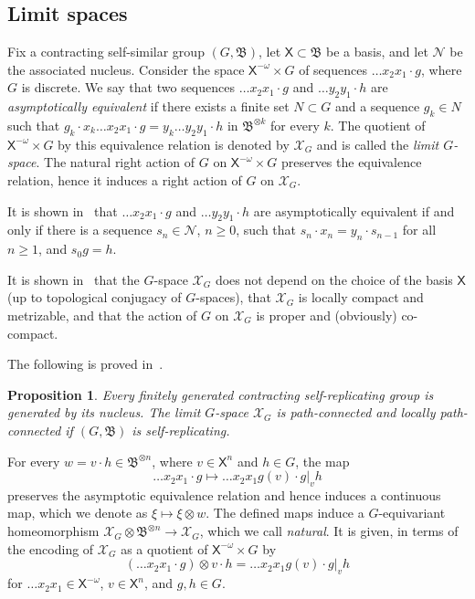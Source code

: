 \documentclass[11pt]{amsart}
\newcommand{\bim}{\mathfrak{B}}
\newcommand{\arr}{\longrightarrow}
\newcommand{\limg}[1][G]{\mathcal{X}_{#1}}
\newcommand{\xmo}{\alb^{-\omega}}
\newcommand{\alb}{\ensuremath{\mathsf{X}}}%
\newcommand{\nuke}{\ensuremath{\mathcal{N}}}%
\theoremstyle{definition}
\theoremstyle{plain}
\newtheorem{main thm}{Theorem}
\newtheorem{prop}[defin]{Proposition}
\theoremstyle{remark}
\theoremstyle{plain}
\begin{document}
\subsection{Limit spaces}
Fix a contracting self-similar group $(G, \bim)$, let $\alb\subset\bim$ be a basis, and let $\nuke$ be the associated nucleus. Consider the space $\alb^{-\omega}\times G$ of sequences $\ldots x_2x_1\cdot g$, where $G$ is discrete. We say that two sequences $\ldots x_2x_1\cdot g$ and $\ldots y_2y_1\cdot h$ are \emph{asymptotically equivalent} if there exists a finite set $N\subset G$ and a sequence $g_k\in N$ such that $g_k\cdot x_k\ldots x_2x_1\cdot g=y_k\ldots y_2y_1\cdot h$ in $\bim^{\otimes k}$ for every $k$. The quotient of $\alb^{-\omega}\times G$ by this equivalence relation is denoted by $\limg$ and is called the \emph{limit $G$-space}. The natural right action of $G$ on $\alb^{-\omega}\times G$ preserves the equivalence relation, hence it induces a right action of $G$ on $\limg$.

It is shown in~\cite[Proposition~3.2.6]{Nek:book} that $\ldots x_2x_1\cdot g$ and $\ldots y_2y_1\cdot h$ are asymptotically equivalent if and only if there is a sequence $s_n\in\nuke$, $n\ge 0$, such that $s_n\cdot x_n=y_n\cdot s_{n-1}$ for all $n\ge 1$, and $s_0g=h$.

It is shown in~\cite[\S~3.2]{Nek:book} that the $G$-space $\limg$ does not depend on the choice of the basis $\alb$ (up to topological conjugacy of $G$-spaces), that $\limg$ is locally compact and metrizable, and that the action of $G$ on $\limg$ is proper and (obviously) co-compact.

The following is proved in~\cite[Theorem~3.5.1]{Nek:book}.

\begin{prop}
\label{prop:locconnected}
Every finitely generated contracting self-replicating group is generated by its nucleus. The limit $G$-space $\limg$ is path-connected and locally path-connected if $(G, \bim)$ is self-replicating.
\end{prop}


For every $w=v\cdot h\in\bim^{\otimes n}$, where $v\in\alb^n$ and $h\in G$, the map 
\[\ldots x_2x_1\cdot g\mapsto \ldots x_2x_1g(v)\cdot g|_vh\]
preserves the asymptotic equivalence relation and hence induces a continuous map, which we denote as $\xi\mapsto \xi\otimes w$. The defined maps induce a $G$-equivariant homeomorphism $\limg\otimes\bim^{\otimes n}\arr\limg$, which we call \emph{natural}.
It is given, in terms of the encoding of $\limg$ as a quotient of $\xmo\times G$ by
\[(\ldots x_2x_1\cdot g)\otimes v\cdot h=\ldots x_2x_1g(v)\cdot g|_vh\]
for $\ldots x_2x_1\in\xmo$, $v\in\alb^n$, and $g, h\in G$.
\end{document}
